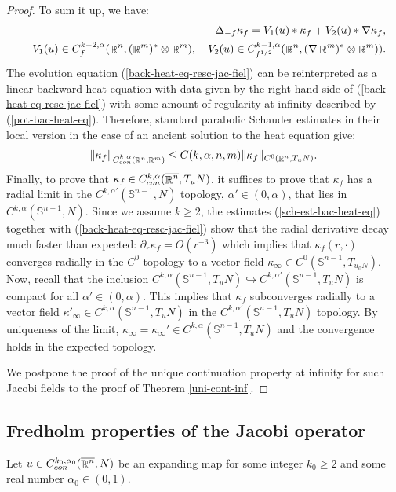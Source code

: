\documentclass[a4paper,11pt,reqno]{amsart}
\def\R{\mathop{\rm \mathbb{R}}\nolimits}
\newcommand{\Sp}{\mathbb{S}}
\begin{document}
\begin{proof}
To sum it up, we have:
\begin{eqnarray}
&&\Delta_{-f}\kappa_f=V_1(u)\ast\kappa_f+V_2(u)\ast\nabla \kappa_f,\label{back-heat-eq-resc-jac-fiel}\\
&&V_1(u)\in C_{f}^{k-2,\alpha}(\R^n,(\R^m)^*\otimes\R^m),\quad V_2(u)\in C_{f^{1/2}}^{k-1,\alpha}(\R^n,(\nabla \R^m)^*\otimes\R^m)).\label{pot-bac-heat-eq}
\end{eqnarray}
The evolution equation (\ref{back-heat-eq-resc-jac-fiel}) can be reinterpreted as a linear backward heat equation with data given by the right-hand side of (\ref{back-heat-eq-resc-jac-fiel}) with some amount of regularity at infinity described by (\ref{pot-bac-heat-eq}). Therefore, standard parabolic Schauder estimates in their local version in the case of an ancient solution to the heat equation give:
 \begin{eqnarray}
\|\kappa_f\|_{C^{k,\alpha}_{con}(\R^n,\R^m)}\leq C(k,\alpha,n,m)\|\kappa_f\|_{C^0(\R^n,T_uN)}.\label{sch-est-bac-heat-eq}
\end{eqnarray}
Finally, to prove that $\kappa_f\in C^{k,\alpha}_{con}(\overline{\R^n},T_uN)$, it suffices to prove that $\kappa_f$ has a radial limit in the $C^{k,\alpha'}(\Sp^{n-1},N)$ topology, $\alpha'\in(0,\alpha)$, that lies in $C^{k,\alpha}(\Sp^{n-1},N).$ Since we assume $k\geq 2$, the estimates (\ref{sch-est-bac-heat-eq}) together with (\ref{back-heat-eq-resc-jac-fiel}) show that the radial derivative decay much faster than expected: $\partial_r\kappa_f=\textit{O}(r^{-3})$ which implies that $\kappa_f(r,\cdot)$ converges radially in the $C^0$ topology to a vector field $\kappa_{\infty}\in C^0(\Sp^{n-1},T_{u_0N})$. Now, recall that the inclusion $C^{k,\alpha}(\Sp^{n-1},T_uN)\hookrightarrow C^{k,\alpha'}(\Sp^{n-1},T_uN)$ is compact for all $\alpha'\in(0,\alpha)$. This implies that $\kappa_f$ subconverges radially to a vector field $\kappa'_{\infty}\in C^{k,\alpha}(\Sp^{n-1},T_uN)$ in the $C^{k,\alpha'}(\Sp^{n-1},T_uN)$ topology. By uniqueness of the limit, $\kappa_{\infty}=\kappa_{\infty}'\in C^{k,\alpha}(\Sp^{n-1},T_uN)$ and the convergence holds in the expected topology.

We postpone the proof of the unique continuation property at infinity for such Jacobi fields to the proof of Theorem \ref{uni-cont-inf}.

\end{proof}

\subsection{Fredholm properties of the Jacobi operator}\label{Fred-prop-Jac-op-subsec}
Let $u\in C_{con}^{k_0,\alpha_0}(\overline{\R^n},N)$ be an expanding map for some integer $k_0\geq 2$ and some real number $\alpha_0\in(0,1)$.
\end{document}
